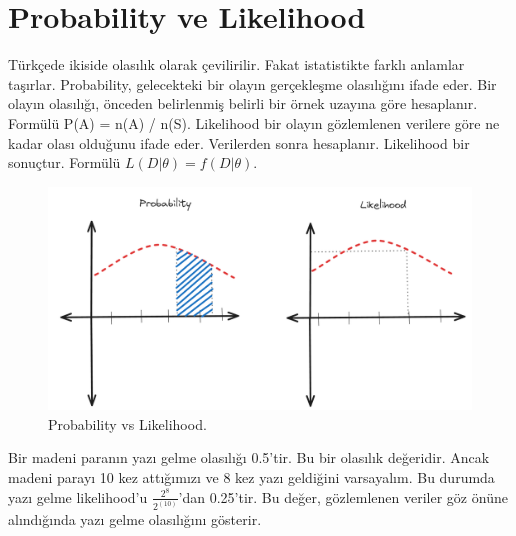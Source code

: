 \section{Probability ve Likelihood}
Türkçede ikiside olasılık olarak çevilirilir. Fakat istatistikte farklı anlamlar taşırlar. Probability, gelecekteki bir olayın gerçekleşme olasılığını ifade eder. Bir olayın olasılığı, önceden belirlenmiş belirli bir örnek uzayına göre hesaplanır. Formülü P(A) = n(A) / n(S). Likelihood bir olayın gözlemlenen verilere göre ne kadar olası olduğunu ifade eder. Verilerden sonra hesaplanır. Likelihood bir sonuçtur. Formülü $L(D | \theta) = f(D | \theta)$.

\begin{figure}[h]
    \centering
    \includegraphics[width=1\textwidth]{images/probability_vs_likelihood.png}
    \caption{Probability vs Likelihood.}
    \label{fig:enter-label}
\end{figure}

Bir madeni paranın yazı gelme olasılığı 0.5'tir. Bu bir olasılık değeridir. Ancak madeni parayı 10 kez attığımızı ve 8 kez yazı geldiğini varsayalım. Bu durumda yazı gelme likelihood'u $\frac{2^8}{2^(10)}$'dan 0.25'tir. Bu değer, gözlemlenen veriler göz önüne alındığında yazı gelme olasılığını gösterir.

\newpage